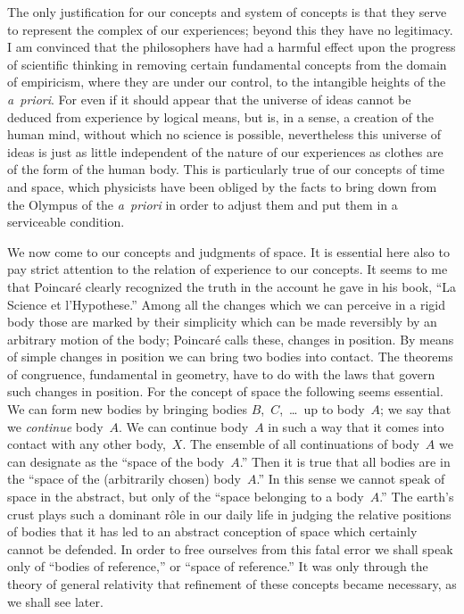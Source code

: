 \documentclass[12pt]{book}[2005/09/16]
\newcommand{\PageSep}[1]{\ignorespaces}
\begin{document}
The only justification for our concepts and system of
concepts is that they serve to represent the complex of
our experiences; beyond this they have no legitimacy. I
am convinced that the philosophers have had a harmful
effect upon the progress of scientific thinking in removing
certain fundamental concepts from the domain of empiricism,
where they are under our control, to the intangible
heights of the \textit{a~priori}. For even if it should appear that
the universe of ideas cannot be deduced from experience
by logical means, but is, in a sense, a creation of the human
mind, without which no science is possible, nevertheless
\PageSep{3}
this universe of ideas is just as little independent of the
nature of our experiences as clothes are of the form of
the human body. This is particularly true of our concepts
of time and space, which physicists have been
%
obliged by the facts to bring down from the Olympus of
the \textit{a~priori} in order to adjust them and put them in a
serviceable condition.

We now come to our concepts and judgments of space.
It is essential here also to pay strict attention to the
relation of experience to our concepts. It seems to me
that Poincaré clearly recognized the truth in the account
he gave in his book, ``La Science et l'Hypothese.''
Among all the changes which we can perceive in a rigid
body those are marked by their simplicity which can be
made reversibly by an arbitrary motion of the body;
Poincaré calls these, changes in position. By means of
simple changes in position we can bring two bodies into
contact. The theorems of congruence, fundamental in
%
%
geometry, have to do with the laws that govern such
changes in position. For the concept of space the following
%
seems essential. We can form new bodies by bringing
bodies $B$,~$C$,~\dots\ up to body~$A$; we say that we \emph{continue}
body~$A$. We can continue body~$A$ in such a way that
it comes into contact with any other body,~$X$. The
ensemble of all continuations of body~$A$ we can designate
as the ``space of the body~$A$.'' Then it is true that all
bodies are in the ``space of the (arbitrarily chosen) body~$A$.''
In this sense we cannot speak of space in the
abstract, but only of the ``space belonging to a body~$A$.''
The earth's crust plays such a dominant rôle in our daily
\PageSep{4}
life in judging the relative positions of bodies that it has
led to an abstract conception of space which certainly
cannot be defended. In order to free ourselves from this
fatal error we shall speak only of ``bodies of reference,''
or ``space of reference.'' It was only through the theory
%
%
of general relativity that refinement of these concepts
became necessary, as we shall see later.
\end{document}
